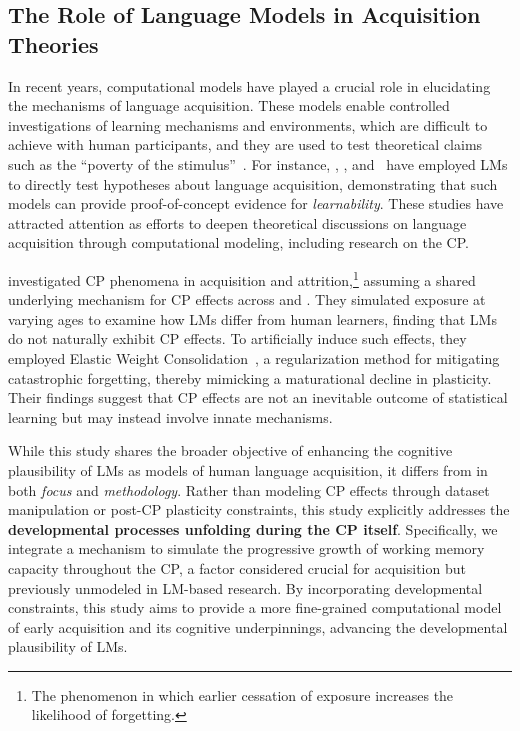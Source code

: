 \subsection{The Role of Language Models in Acquisition Theories}


In recent years, computational models have played a crucial role in elucidating the mechanisms of language acquisition. 
These models enable controlled investigations of learning mechanisms and environments, which are difficult to achieve with human participants, and they are used to test theoretical claims such as the ``poverty of the stimulus''~\cite{Clark-etal-2011}. 
For instance, \citet{McCoy-etal-2020}, \citet{Wilcox-etal-2024}, and~\citet{warstadt-etal-2023-findings} have employed LMs to directly test hypotheses about language acquisition, demonstrating that such models can provide proof-of-concept evidence for \textit{learnability}. 
These studies have attracted attention as efforts to deepen theoretical discussions on language acquisition through computational modeling, including research on the CP.


\citet{Constantinescu-tacl2025} investigated CP phenomena in \ltwo acquisition and \lone attrition,\footnote{The phenomenon in which earlier cessation of \lone exposure increases the likelihood of \lone forgetting.} assuming a shared underlying mechanism for CP effects across \lone and \ltwo. 
They simulated \ltwo exposure at varying ages to examine how LMs differ from human learners, finding that LMs do not naturally exhibit CP effects. 
To artificially induce such effects, they employed Elastic Weight Consolidation~\cite{Kirkpatrick-etal-2017}, a regularization method for mitigating catastrophic forgetting, thereby mimicking a maturational decline in plasticity. 
Their findings suggest that CP effects are not an inevitable outcome of statistical learning but may instead involve innate mechanisms.


While this study shares the broader objective of enhancing the cognitive plausibility of LMs as models of human language acquisition, it differs from \citet{Constantinescu-tacl2025} in both \textit{focus} and \textit{methodology}. 
Rather than modeling CP effects through dataset manipulation or post-CP plasticity constraints, this study explicitly addresses the \textbf{developmental processes unfolding during the CP itself}. 
Specifically, we integrate a mechanism to simulate the progressive growth of working memory capacity throughout the CP, a factor considered crucial for \lone acquisition but previously unmodeled in LM-based research. 
By incorporating developmental constraints, this study aims to provide a more fine-grained computational model of early \lone acquisition and its cognitive underpinnings, advancing the developmental plausibility of LMs.